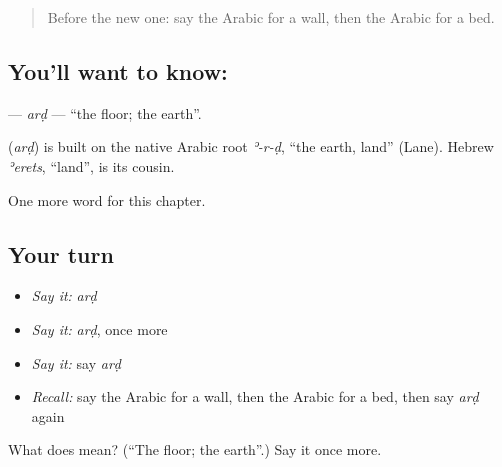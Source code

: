 \label{lesson:AR-C70-ard}



\begin{quote}
Before the new one: say the Arabic for a wall, then the Arabic for a bed.
\end{quote}

\subsection*{You'll want to know: }
\textbf{} — \emph{arḍ} — \textquotedblleft{}the floor; the earth\textquotedblright{}.

\begin{cousinweb}
\textbf{} (\emph{arḍ}) is built on the native Arabic root \emph{ʾ-r-ḍ}, \textquotedblleft{}the earth, land\textquotedblright{} (Lane). Hebrew \emph{ʾerets}, \textquotedblleft{}land\textquotedblright{}, is its cousin.
\end{cousinweb}

\begin{grammarlens}[title={What you've built}]
One more word for this chapter.
\end{grammarlens}

\subsection*{Your turn}
\begin{itemize}
\raggedright
  \item \emph{Say it:} \emph{arḍ}
  \item \emph{Say it:} \emph{arḍ}, once more
  \item \emph{Say it:} say \emph{arḍ}
  \item \emph{Recall:} say the Arabic for a wall, then the Arabic for a bed, then say \emph{arḍ} again
\end{itemize}

\begin{tcolorbox}[breakable,colback=teal!4,colframe=teal!35!black,title={Before you move on}]
What does  mean? (\textquotedblleft{}The floor; the earth\textquotedblright{}.) Say it once more.
\end{tcolorbox}

